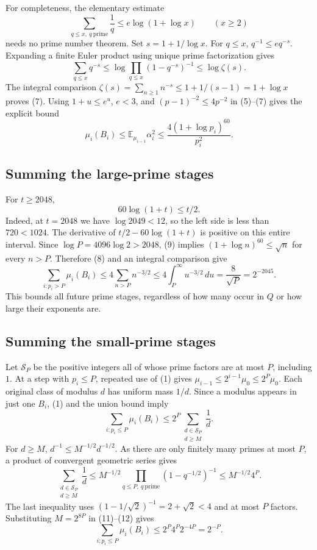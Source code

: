 For completeness, the elementary estimate
\[
 \sum_{q\le x,\ q\ \mathrm{prime}}\frac1q
 \le e\log(1+\log x)\qquad(x\ge2)
\tag{7}
\]
needs no prime number theorem. Set $s=1+1/\log x$. For $q\le x$, $q^{-1}\le e q^{-s}$. Expanding a finite Euler product using unique prime factorization gives
\[
 \sum_{q\le x}q^{-s}
 \le\log\prod_{q\le x}(1-q^{-s})^{-1}
 \le\log\zeta(s).
\]
The integral comparison
$\zeta(s)=\sum_{n\ge1}n^{-s}\le1+1/(s-1)=1+\log x$
proves (7). Using $1+u\le e^u$, $e<3$, and $(p-1)^{-2}\le4p^{-2}$ in (5)--(7) gives the explicit bound
\[
 \boxed{\displaystyle
 \mu_i(B_i)\le\mathbb E_{\mu_{i-1}}\alpha_i^2
 \le\frac{4(1+\log p_i)^{60}}{p_i^2}.}
\tag{8}
\]

\subsection{Summing the large-prime stages}
For $t\ge2048$,
\[
 60\log(1+t)\le t/2.
\tag{9}
\]
Indeed, at $t=2048$ we have $\log2049<12$, so the left side is less than $720<1024$. The derivative of $t/2-60\log(1+t)$ is positive on this entire interval. Since $\log P=4096\log2>2048$, (9) implies
$(1+\log n)^{60}\le\sqrt n$ for every $n>P$. Therefore (8) and an integral comparison give
\[
 \sum_{i:p_i>P}\mu_i(B_i)
 \le4\sum_{n>P}n^{-3/2}
 \le4\int_P^\infty u^{-3/2}\,du
 =\frac8{\sqrt P}=2^{-2045}.
\tag{10}
\]
This bounds all future prime stages, regardless of how many occur in $Q$ or how large their exponents are.

\subsection{Summing the small-prime stages}
Let $\mathcal S_P$ be the positive integers all of whose prime factors are at most $P$, including $1$. At a step with $p_i\le P$, repeated use of (1) gives $\mu_{i-1}\le2^{i-1}\mu_0\le2^P\mu_0$. Each original class of modulus $d$ has uniform mass $1/d$. Since a modulus appears in just one $B_i$, (1) and the union bound imply
\[
 \sum_{i:p_i\le P}\mu_i(B_i)
 \le2^P\sum_{\substack{d\in\mathcal S_P\\d\ge M}}\frac1d.
\tag{11}
\]
For $d\ge M$, $d^{-1}\le M^{-1/2}d^{-1/2}$. As there are only finitely many primes at most $P$, a product of convergent geometric series gives
\[
 \sum_{\substack{d\in\mathcal S_P\\d\ge M}}\frac1d
 \le M^{-1/2}\prod_{q\le P,\ q\ \mathrm{prime}}
      (1-q^{-1/2})^{-1}
 \le M^{-1/2}4^P.
\tag{12}
\]
The last inequality uses $(1-1/\sqrt2)^{-1}=2+\sqrt2<4$ and at most $P$ factors. Substituting $M=2^{8P}$ in (11)--(12) gives
\[
 \sum_{i:p_i\le P}\mu_i(B_i)\le2^P4^P2^{-4P}=2^{-P}.
\tag{13}
\]

